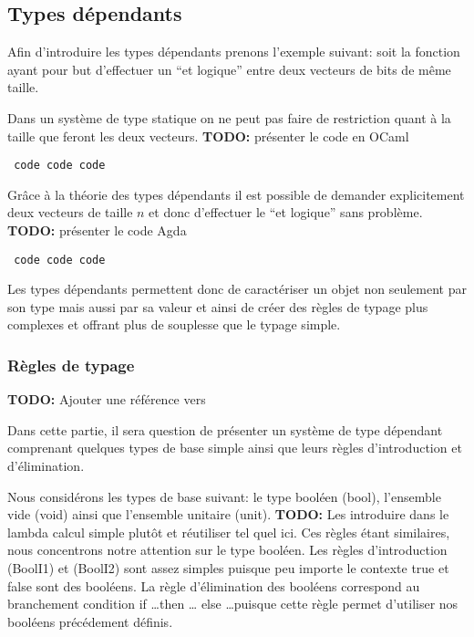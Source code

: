 \documentclass{article}
\newcommand{\TODO}[1]{\textbf{TODO:} #1}
\theoremstyle{definition}
\theoremstyle{remark}
\begin{document}
\subsection{Types dépendants}

Afin d'introduire les types dépendants prenons l'exemple suivant: soit
la fonction ayant pour but d'effectuer un ``et logique'' entre deux
vecteurs de bits de même taille.

Dans un système de type statique on ne peut pas faire de restriction
quant à la taille que feront les deux vecteurs.  
\TODO{présenter le code en OCaml}

\begin{verbatim}
 code code code
\end{verbatim}

Grâce à la théorie des types dépendants il est possible de demander
explicitement deux vecteurs de taille \(n\) et donc d'effectuer le
``et logique'' sans problème. 
\TODO{présenter le code Agda}

\begin{verbatim}
 code code code
\end{verbatim}


Les types dépendants permettent donc de caractériser un objet non
seulement par son type mais aussi par sa valeur et ainsi de créer des
règles de typage plus complexes et offrant plus de souplesse que le
typage simple.

\subsubsection{Règles de typage}

\TODO{Ajouter une référence vers \citep{hottbook,thompson:types-fp}}

Dans cette partie, il sera question de présenter un système de type
dépendant comprenant quelques types de base simple ainsi que leurs
règles d'introduction et d'élimination.

Nous considérons les types de base suivant: le type booléen
(\textsf{bool}), l'ensemble vide (\textsf{void}) ainsi que l'ensemble
unitaire (\textsf{unit}). \TODO{Les introduire dans le lambda calcul
  simple plutôt et réutiliser tel quel ici.} Ces règles étant
similaires, nous concentrons notre attention sur le type booléen. Les
règles d'introduction (BoolI1) et (BoolI2) sont assez simples puisque
peu importe le contexte \textsf{true} et \textsf{false} sont des
booléens.  La règle d'élimination des booléens correspond au
branchement condition \textsf{if} \ldots \textsf{then} \ldots
\textsf{else} \ldots puisque cette règle permet d'utiliser nos
booléens précédement définis.
\end{document}
